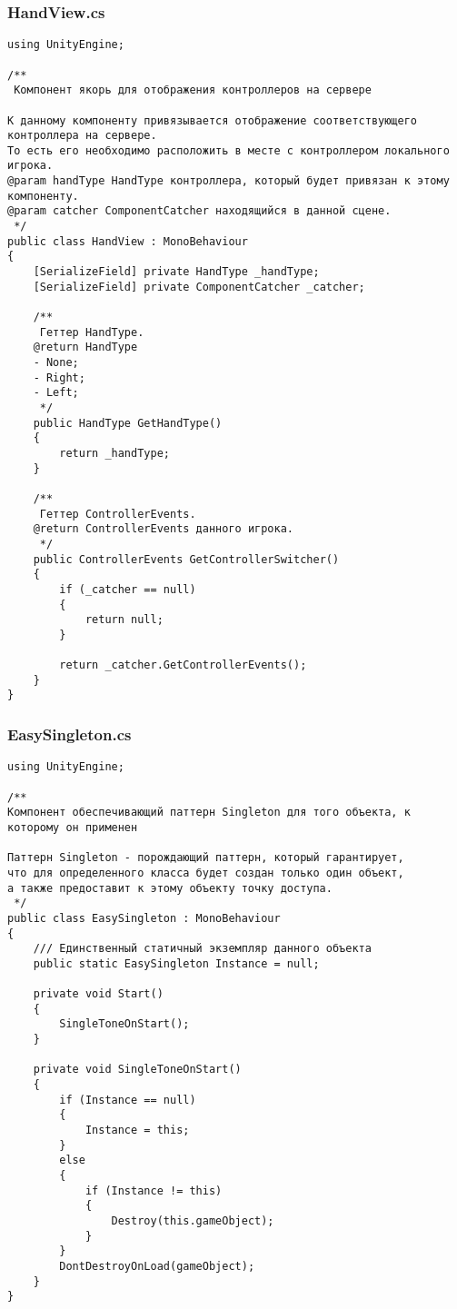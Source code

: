 \subsubsection*{HandView.cs}
\begin{verbatim}
﻿using UnityEngine;

/**
 Компонент якорь для отображения контроллеров на сервере

К данному компоненту привязывается отображение соответствующего контроллера на сервере. 
То есть его необходимо расположить в месте с контроллером локального игрока.
@param handType HandType контроллера, который будет привязан к этому компоненту.
@param catcher ComponentCatcher находящийся в данной сцене.
 */
public class HandView : MonoBehaviour
{
    [SerializeField] private HandType _handType;
    [SerializeField] private ComponentCatcher _catcher;

    /**
     Геттер HandType.
    @return HandType
    - None;
    - Right;
    - Left;
     */
    public HandType GetHandType()
    {
        return _handType;
    }

    /**
     Геттер ControllerEvents.
    @return ControllerEvents данного игрока.
     */
    public ControllerEvents GetControllerSwitcher()
    {
        if (_catcher == null)
        {
            return null;
        }

        return _catcher.GetControllerEvents();
    }
}

\end{verbatim}
\subsubsection*{EasySingleton.cs}
\begin{verbatim}
﻿using UnityEngine;

/**
Компонент обеспечивающий паттерн Singleton для того объекта, к которому он применен

Паттерн Singleton - порождающий паттерн, который гарантирует, 
что для определенного класса будет создан только один объект, 
а также предоставит к этому объекту точку доступа.
 */
public class EasySingleton : MonoBehaviour
{
    /// Единственный статичный экземпляр данного объекта
    public static EasySingleton Instance = null;

    private void Start()
    {
        SingleToneOnStart();
    }

    private void SingleToneOnStart()
    {
        if (Instance == null)
        {
            Instance = this;
        }
        else
        {
            if (Instance != this)
            {
                Destroy(this.gameObject);
            }
        }
        DontDestroyOnLoad(gameObject);
    }
}

\end{verbatim}

